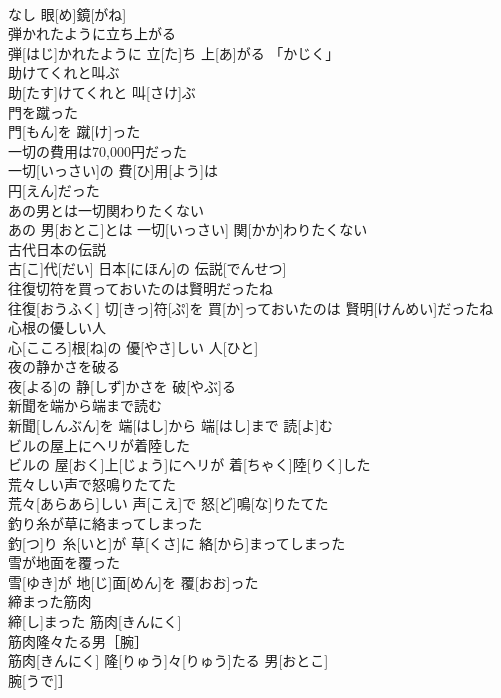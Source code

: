\documentclass[8pt]{extreport}
\begin{document}
\begin{CJK}{UTF8}{min}
\\	なし 眼[め]鏡[がね]
\\	弾かれたように立ち上がる	
\\	弾[はじ]かれたように 立[た]ち 上[あ]がる 「かじく」
\\	助けてくれと叫ぶ	
\\	助[たす]けてくれと 叫[さけ]ぶ
\\	門を蹴った	
\\	門[もん]を 蹴[け]った
\\	一切の費用は70,000円だった	
\\	一切[いっさい]の 費[ひ]用[よう]は 
\\	円[えん]だった
\\	あの男とは一切関わりたくない	
\\	あの 男[おとこ]とは 一切[いっさい] 関[かか]わりたくない
\\	古代日本の伝説	
\\	古[こ]代[だい] 日本[にほん]の 伝説[でんせつ]
\\	往復切符を買っておいたのは賢明だったね	
\\	往復[おうふく] 切[きっ]符[ぷ]を 買[か]っておいたのは 賢明[けんめい]だったね
\\	心根の優しい人	
\\	心[こころ]根[ね]の 優[やさ]しい 人[ひと]
\\	夜の静かさを破る	
\\	夜[よる]の 静[しず]かさを 破[やぶ]る
\\	新聞を端から端まで読む	
\\	新聞[しんぶん]を 端[はし]から 端[はし]まで 読[よ]む
\\	ビルの屋上にヘリが着陸した	
\\	ビルの 屋[おく]上[じょう]にヘリが 着[ちゃく]陸[りく]した
\\	荒々しい声で怒鳴りたてた	
\\	荒々[あらあら]しい 声[こえ]で 怒[ど]鳴[な]りたてた
\\	釣り糸が草に絡まってしまった	
\\	釣[つ]り 糸[いと]が 草[くさ]に 絡[から]まってしまった
\\	雪が地面を覆った	
\\	雪[ゆき]が 地[じ]面[めん]を 覆[おお]った
\\	締まった筋肉	
\\	締[し]まった 筋肉[きんにく]
\\	筋肉隆々たる男［腕］	
\\	筋肉[きんにく] 隆[りゅう]々[りゅう]たる 男[おとこ]
\\	腕[うで]］

\end{CJK}
\end{document}
